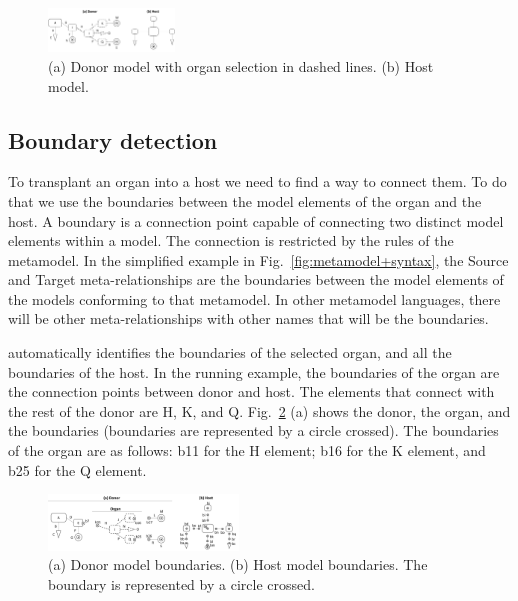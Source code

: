 \begin{figure}[tb]
    \centering
    \includegraphics[width=0.30\textwidth]{Figures/donor+host.png}
    \caption{(a) Donor model with organ selection in dashed lines. (b) Host model.}
    \label{fig:donor_host}
\end{figure}


\subsection{Boundary detection}

To transplant an organ into a host we need to find a way to connect them. To do that we use the boundaries between the model elements of the organ and the host. A boundary is a connection point capable of connecting two distinct model elements within a model. The connection is restricted by the rules of the metamodel. In the simplified example in Fig.~\ref{fig:metamodel+syntax}, the Source and Target meta-relationships are the boundaries between the model elements of the models conforming to that metamodel. In other metamodel languages, there will be other meta-relationships with other names that will be the boundaries.

\ApproachName{} automatically identifies the boundaries of the selected organ, and all the boundaries of the host. In the running example, the boundaries of the organ are the connection points between donor and host. The elements that connect with the rest of the donor are H, K, and Q. Fig.~\ref{fig:org_bound} (a) shows the donor, the organ, and the boundaries (boundaries are represented by a circle crossed). The boundaries of the organ are as follows: b11 for the H element; b16 for the K element, and b25 for the Q element.

\begin{figure}[tb]
    \centering
    \includegraphics[width=0.45\textwidth]{Figures/donor+host+boundaries.png}
    \caption{(a) Donor model boundaries. (b) Host model boundaries. The boundary is represented by a circle crossed.}
    \label{fig:org_bound}
\end{figure}

